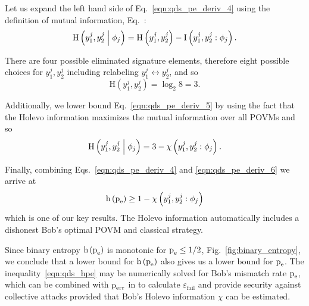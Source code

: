 \noindent Let us expand the left hand side of Eq.~\ref{eqn:qds_pe_deriv_4} using the definition of mutual information, Eq.~:
\begin{equation}\label{eqn:qds_pe_deriv_5}
\text{H}\left(y_1^j, y_2^j \; \middle| \; \phi_j\right) = \text{H}\left(y_1^j, y_2^j\right) - \text{I}\left(y_1^j, y_2^j : \phi_j\right).
\end{equation}

\noindent There are four possible eliminated signature elements, therefore eight possible choices for $y_1^j, y_2^j$ including relabeling $y_1^j \leftrightarrow y_2^j$, and so 
\begin{equation}
\text{H}\left(y_1^j, y_2^j\right) = \log_2 8 = 3.
\end{equation}

\noindent Additionally, we lower bound Eq.~\ref{eqn:qds_pe_deriv_5} by using the fact that the Holevo information maximizes the mutual information over all POVMs 
and so
\begin{equation}\label{eqn:qds_pe_deriv_6}
\text{H}\left(y_1^j, y_2^j \; \middle| \; \phi_j \right) = 3 - \chi\left(y_1^j, y_2^j : \phi_j\right).
\end{equation}

\noindent Finally, combining Eqs.~\ref{eqn:qds_pe_deriv_4} and \ref{eqn:qds_pe_deriv_6} we arrive at
\begin{equation}\label{eqn:qds_hpe}
\text{h}\left(\text{p}_{\text{e}}\right) \ge 1 - \chi \left(y_1^j, y_2^j : \phi_j\right)
\end{equation}
which is one of our key results. The Holevo information automatically includes a dishonest Bob's optimal POVM and classical strategy.

Since binary entropy $\text{h}\left(\text{p}_{\text{e}}\right)$ is monotonic for $\text{p}_{\text{e}} \le 1/2$, Fig.~\ref{fig:binary_entropy}, we conclude that a lower bound for $\text{h}\left(\text{p}_{\text{e}}\right)$ also gives us a lower bound for $\text{p}_{\text{e}}$.  The inequality~\ref{eqn:qds_hpe} may be numerically solved for Bob's mismatch rate $\text{p}_{\text{e}}$, which can be combined with $\text{p}_{\text{err}}$ in to calculate $\varepsilon_{\text{fail}}$ and provide security against collective attacks  provided that Bob's Holevo information $\chi$ can be estimated.

